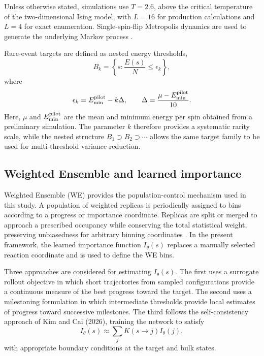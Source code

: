 \documentclass[a4paper,fleqn]{cas-sc}
\let\Oldsubsection\subsection
\renewcommand{\subsection}{\FloatBarrier\Oldsubsection}
\begin{document}
Unless otherwise stated, simulations use $T=2.6$, above the critical temperature of the two-dimensional Ising model, with $L=16$ for production calculations and $L=4$ for exact enumeration. Single-spin-flip Metropolis dynamics are used to generate the underlying Markov process \cite{metropolis1953}.

Rare-event targets are defined as nested energy thresholds,
\begin{equation}
B_k=
\left\{
s:\frac{E(s)}{N}\leq\epsilon_k
\right\},
\end{equation}
where
\begin{equation}
\epsilon_k=E_{\min}^{\rm pilot}-k\Delta,
\qquad
\Delta=\frac{\mu-E_{\min}^{\rm pilot}}{10}.
\label{eq:beyond}
\end{equation}
Here, $\mu$ and $E_{\min}^{\rm pilot}$ are the mean and minimum energy per spin obtained from a preliminary simulation. The parameter $k$ therefore provides a systematic rarity scale, while the nested structure
$B_1\supset B_2\supset\cdots$
allows the same target family to be used for multi-threshold variance reduction.

\subsection{Weighted Ensemble and learned importance}\label{sec:we}

Weighted Ensemble (WE) provides the population-control mechanism used in this study. A population of weighted replicas is periodically assigned to bins according to a progress or importance coordinate. Replicas are split or merged to approach a prescribed occupancy while conserving the total statistical weight, preserving unbiasedness for arbitrary binning coordinates \cite{huber1996,zhang2010}. In the present framework, the learned importance function $I_\theta(s)$ replaces a manually selected reaction coordinate and is used to define the WE bins.

Three approaches are considered for estimating $I_\theta(s)$. The first uses a surrogate rollout objective in which short trajectories from sampled configurations provide a continuous measure of the best progress toward the target. The second uses a milestoning formulation in which intermediate thresholds provide local estimates of progress toward successive milestones. The third follows the self-consistency approach of Kim and Cai (2026), training the network to satisfy
\begin{equation}
I_\theta(s)\approx\sum_jK(s\rightarrow j)I_\theta(j),
\end{equation}
with appropriate boundary conditions at the target and bulk states.
\end{document}
